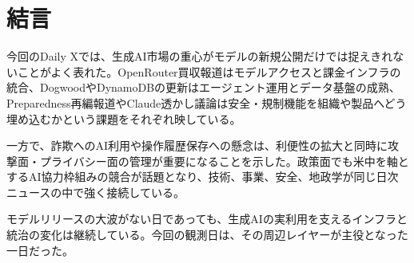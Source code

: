 \section{結言}
今回のDaily Xでは、生成AI市場の重心がモデルの新規公開だけでは捉えきれないことがよく表れた。OpenRouter買収報道はモデルアクセスと課金インフラの統合、DogwoodやDynamoDBの更新はエージェント運用とデータ基盤の成熟、Preparedness再編報道やClaude透かし議論は安全・規制機能を組織や製品へどう埋め込むかという課題をそれぞれ映している。

一方で、詐欺へのAI利用や操作履歴保存への懸念は、利便性の拡大と同時に攻撃面・プライバシー面の管理が重要になることを示した。政策面でも米中を軸とするAI協力枠組みの競合が話題となり、技術、事業、安全、地政学が同じ日次ニュースの中で強く接続している。

モデルリリースの大波がない日であっても、生成AIの実利用を支えるインフラと統治の変化は継続している。今回の観測日は、その周辺レイヤーが主役となった一日だった。

